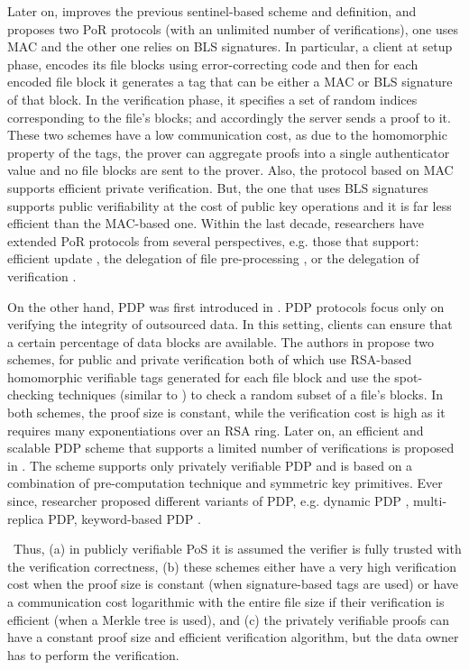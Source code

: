 Later on, \cite{DBLP:conf/asiacrypt/ShachamW08} improves the previous sentinel-based scheme and definition, and proposes two PoR protocols (with an unlimited number of verifications), one uses  MAC and the other one relies on BLS signatures. In particular, a client at setup phase, encodes its file blocks using error-correcting code and then for each encoded file block it generates a  tag that can be either a MAC or BLS signature of that block. In the verification phase, it specifies a set of random indices corresponding to the file's blocks; and accordingly the server sends a proof to it. These two  schemes have a low communication cost, as due   to the homomorphic property of the tags,  the prover can aggregate  proofs  into a single authenticator value and no file blocks  are sent to the prover. Also, the protocol based on MAC supports efficient private verification. But, the one that uses BLS signatures supports public verifiability at the cost of public key operations and it is far less efficient than the MAC-based one. Within the  last decade, researchers have extended PoR protocols from several perspectives, e.g. those that support:  efficient update \cite{DBLP:conf/ccs/ShiSP13}, the delegation of file pre-processing \cite{ArmknechtBBK16}, or the delegation of verification \cite{armknecht2014outsourced}.  


On the other hand, PDP was first introduced in \cite{DBLP:conf/ccs/AtenieseBCHKPS07}. PDP protocols focus only on verifying the  integrity of outsourced data. In this setting,  clients can ensure that a certain percentage of data blocks are available. The authors in \cite{DBLP:conf/ccs/AtenieseBCHKPS07} propose two schemes, for public and private verification both of which use RSA-based homomorphic verifiable tags  generated for each file block and use the spot-checking techniques (similar to \cite{DBLP:conf/asiacrypt/ShachamW08}) to check a random subset of a file's blocks. In both schemes, the proof size is constant, while the verification cost is high as it requires  many  exponentiations over an RSA ring. Later on, an  efficient and scalable  PDP scheme that supports a limited number of verifications is proposed in \cite{AteniesePMT08}. The scheme supports only privately verifiable PDP and is based on a combination of pre-computation technique and symmetric key primitives.  Ever since, researcher proposed different variants of PDP, e.g.  dynamic PDP \cite{ErwayKPT09}, multi-replica PDP\cite{DistributedPDP}, keyword-based PDP \cite{SenguptaR18}.  

\
Thus,  (a) in publicly verifiable PoS it is assumed the verifier is fully trusted with the verification correctness, (b) these schemes either have a very high verification cost when the proof size is constant (when signature-based tags are used) or have a communication cost logarithmic with the entire file size if their verification is efficient (when a Merkle tree is used),  and (c) the privately verifiable proofs can have a constant proof size and efficient verification algorithm, but the data owner has to perform the verification. 



